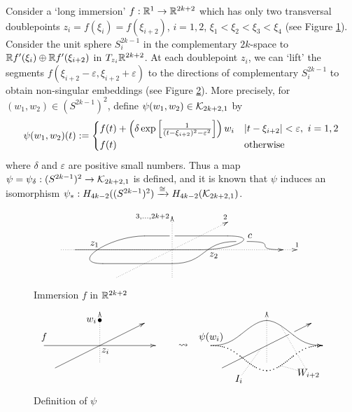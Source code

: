 Consider a `long immersion' $f:\mathbb{R}^1 \to \mathbb{R}^{2k+2}$ which has only two transversal doublepoints
$z_i = f(\xi_i )=f(\xi_{i+2} )$, $i=1,2$, $\xi_1 < \xi_2 < \xi_3 < \xi_4$ (see Figure \ref{fig_f}).
Consider the unit sphere $S^{2k-1}_i$ in the complementary $2k$-space to $\mathbb{R} f' (\xi_i ) \oplus \mathbb{R} f' (\xi_{i+2})$ in
$T_{z_i}\mathbb{R}^{2k+2}$.
At each doublepoint $z_i$, we can `lift' the segments $f(\xi_{i+2} -\varepsilon , \xi_{i+2} +\varepsilon )$ to the
directions of complementary $S^{2k-1}_i$ to obtain non-singular embeddings (see Figure \ref{fig_blowup}).
More precisely, for $(w_1 ,w_2 ) \in (S^{2k-1})^2$, define $\psi (w_1 ,w_2 )\in \mathcal{K}_{2k+2 ,1}$ by
\[
 \psi (w_1 ,w_2 )(t) :=
 \begin{cases}
  f(t)+\left( \delta \exp \left[ \frac{1}{(t-\xi_{i+2} )^2 -\varepsilon^2}\right] \right) w_i
   & \lvert {t-\xi_{i+2}} \rvert < \varepsilon ,\ i=1,2 \\
  f(t) & \text{otherwise}
 \end{cases}
\]
where $\delta$ and $\varepsilon$ are positive small numbers.
Thus a map $\psi =\psi_{\delta}: (S^{2k-1})^2 \to \mathcal{K}_{2k+2 ,1}$ is defined, and it is known that $\psi$ induces an
isomorphism $\psi_* : H_{4k-2}((S^{2k-1})^2) \xrightarrow{\cong} H_{4k-2}(\mathcal{K}_{2k+2 ,1})$.



\begin{figure}[htb]%
\[
 \begin{xy}
 {\ar@{.>}(0,0);(85,0)^>{1}},{\ar@{.>}(40,-10);(40,12)^>{3,\dots ,2k+2}},{\ar@{.>}(20,-10);(60,10)^>{2}},
 {\ar@{-}(5,0);(50,0)},{\ar@{-}(30,5);(39,5)},{\ar@{-}(41,5);(60,5)},
 {\ar@{-}@(r,r)(50,0);(60,5)},{\ar@{-}@(l,l)(30,5);(15,-5)},
 {\ar@{-}(15,-5);(40,-5)},
 {\ar@{-}@(r,l)(40,-5);(63,3)},
 {\ar@(r,l)(67,3);(80,0)},
 (12,2)*{z_1}, (55,-2)*{z_2}, (68,5)*{c}
 \end{xy}
\]
\caption{Immersion $f$ in $\mathbb{R}^{2k+2}$}\label{fig_f}
\end{figure}
\begin{figure}[htb]
\[
 \begin{xy}%
 {\ar (0,0);(40,0)}, {\ar (4,-8);(36,8)}, {\ar@{.>}(20,-6);(20,12)},
 (0,3)*{f}, (22,-2)*{z_i}, (20,9)*{\bullet}, (17,9)*{w_i},
 (50,0)*{\leadsto},
 {(60,0);(100,0) **\crv{(65,0)&(70,3)&(80,12)&(90,3)&(95,0)}?>*\dir{>}},
 {(60,0);(100,0) **\crv{~*{.}(65,0)&(70,-3)&(80,-12)&(90,-3)&(95,0)}?>*\dir{>}},
 (60,3)*{\psi (w_i )},
 {\ar@{-}(64,-8);(88,4)}, {\ar (90,5);(96,8)}, {\ar@{.>}(80,-6);(80,12)},
 (70,-12)*{I_i}="I", {\ar@{.}"I";(78,-1)},
 (95,-10)*{W_{i+2}}="W", {\ar@{.}"W";(85,7.2)},{\ar@{.}"W";(85,-7.2)}
 \end{xy}
\]
\caption{Definition of $\psi$}\label{fig_blowup}
\end{figure}


